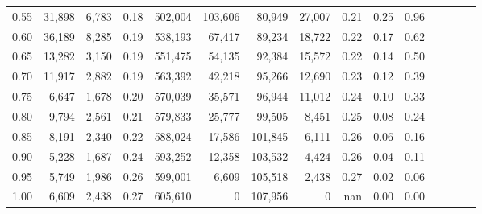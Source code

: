 \begin{tabular}{rrrcrrrrrrrrrrr}
0.55 &   31,898 &   6,783 &                                       0.18 &  502,004 &  103,606 &   80,949 &   27,007 &  0.21 &  0.25 &                         0.96 \\
0.60 &   36,189 &   8,285 &                                       0.19 &  538,193 &   67,417 &   89,234 &   18,722 &  0.22 &  0.17 &                         0.62 \\
0.65 &   13,282 &   3,150 &                                       0.19 &  551,475 &   54,135 &   92,384 &   15,572 &  0.22 &  0.14 &                         0.50 \\
0.70 &   11,917 &   2,882 &                                       0.19 &  563,392 &   42,218 &   95,266 &   12,690 &  0.23 &  0.12 &                         0.39 \\
0.75 &    6,647 &   1,678 &                                       0.20 &  570,039 &   35,571 &   96,944 &   11,012 &  0.24 &  0.10 &                         0.33 \\
0.80 &    9,794 &   2,561 &                                       0.21 &  579,833 &   25,777 &   99,505 &    8,451 &  0.25 &  0.08 &                         0.24 \\
0.85 &    8,191 &   2,340 &                                       0.22 &  588,024 &   17,586 &  101,845 &    6,111 &  0.26 &  0.06 &                         0.16 \\
0.90 &    5,228 &   1,687 &                                       0.24 &  593,252 &   12,358 &  103,532 &    4,424 &  0.26 &  0.04 &                         0.11 \\
0.95 &    5,749 &   1,986 &                                       0.26 &  599,001 &    6,609 &  105,518 &    2,438 &  0.27 &  0.02 &                         0.06 \\
1.00 &    6,609 &   2,438 &                                       0.27 &  605,610 &        0 &  107,956 &        0 &   nan &  0.00 &                         0.00 \\
\bottomrule
\end{tabular}
